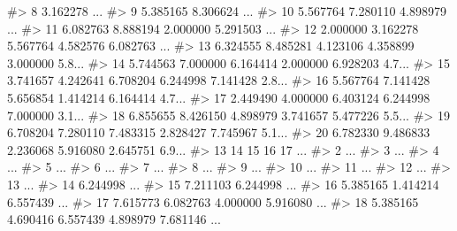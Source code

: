 \documentclass[
  letterpaper,
]{krantz}
\makeatletter
\newenvironment{Shaded}{\begin{snugshade}}{\end{snugshade}}
\newcommand{\CommentTok}[1]{\textcolor[rgb]{0.37,0.37,0.37}{#1}}
\newenvironment{kframe}{%
\medskip{}
\setlength{\fboxsep}{.8em}
 \def\at@end@of@kframe{}%
 \ifinner\ifhmode%
  \def\at@end@of@kframe{\end{minipage}}%
  \begin{minipage}{\columnwidth}%
 \fi\fi%
 \def\FrameCommand##1{\hskip\@totalleftmargin \hskip-\fboxsep
 \colorbox{shadecolor}{##1}\hskip-\fboxsep
     \hskip-\linewidth \hskip-\@totalleftmargin \hskip\columnwidth}%
 \MakeFramed {\advance\hsize-\width
   \@totalleftmargin\z@ \linewidth\hsize
   \@setminipage}}%
 {\par\unskip\endMakeFramed%
 \at@end@of@kframe}
\renewenvironment{Shaded}{\begin{kframe}}{\end{kframe}}
\makeatother
\begin{document}
\begin{Shaded}
\begin{Highlighting}[]
\CommentTok{\#\textgreater{} 8  3.162278                                        ...}
\CommentTok{\#\textgreater{} 9  5.385165 8.306624                               ...}
\CommentTok{\#\textgreater{} 10 5.567764 7.280110 4.898979                      ...}
\CommentTok{\#\textgreater{} 11 6.082763 8.888194 2.000000 5.291503             ...}
\CommentTok{\#\textgreater{} 12 2.000000 3.162278 5.567764 4.582576 6.082763    ...}
\CommentTok{\#\textgreater{} 13 6.324555 8.485281 4.123106 4.358899 3.000000 5.8...}
\CommentTok{\#\textgreater{} 14 5.744563 7.000000 6.164414 2.000000 6.928203 4.7...}
\CommentTok{\#\textgreater{} 15 3.741657 4.242641 6.708204 6.244998 7.141428 2.8...}
\CommentTok{\#\textgreater{} 16 5.567764 7.141428 5.656854 1.414214 6.164414 4.7...}
\CommentTok{\#\textgreater{} 17 2.449490 4.000000 6.403124 6.244998 7.000000 3.1...}
\CommentTok{\#\textgreater{} 18 6.855655 8.426150 4.898979 3.741657 5.477226 5.5...}
\CommentTok{\#\textgreater{} 19 6.708204 7.280110 7.483315 2.828427 7.745967 5.1...}
\CommentTok{\#\textgreater{} 20 6.782330 9.486833 2.236068 5.916080 2.645751 6.9...}
\CommentTok{\#\textgreater{}          13       14       15       16       17    ...}
\CommentTok{\#\textgreater{} 2                                                  ...}
\CommentTok{\#\textgreater{} 3                                                  ...}
\CommentTok{\#\textgreater{} 4                                                  ...}
\CommentTok{\#\textgreater{} 5                                                  ...}
\CommentTok{\#\textgreater{} 6                                                  ...}
\CommentTok{\#\textgreater{} 7                                                  ...}
\CommentTok{\#\textgreater{} 8                                                  ...}
\CommentTok{\#\textgreater{} 9                                                  ...}
\CommentTok{\#\textgreater{} 10                                                 ...}
\CommentTok{\#\textgreater{} 11                                                 ...}
\CommentTok{\#\textgreater{} 12                                                 ...}
\CommentTok{\#\textgreater{} 13                                                 ...}
\CommentTok{\#\textgreater{} 14 6.244998                                        ...}
\CommentTok{\#\textgreater{} 15 7.211103 6.244998                               ...}
\CommentTok{\#\textgreater{} 16 5.385165 1.414214 6.557439                      ...}
\CommentTok{\#\textgreater{} 17 7.615773 6.082763 4.000000 5.916080             ...}
\CommentTok{\#\textgreater{} 18 5.385165 4.690416 6.557439 4.898979 7.681146    ...}

\end{Highlighting}
\end{Shaded}
\end{document}
